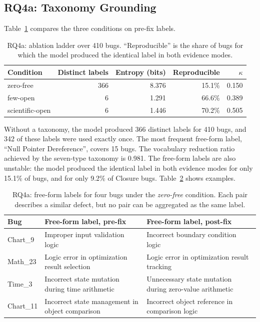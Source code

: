 \documentclass{iutbscthesis}
\begin{document}
\subsection{RQ4a: Taxonomy Grounding}
\label{sec:rq4a}

Table~\ref{tab:rq4a} compares the three conditions on pre-fix labels.

\begin{table}[!htbp]
    \centering
    \begin{tabular}{l r r r r}
        \toprule
        \textbf{Condition} & \textbf{Distinct labels} & \textbf{Entropy (bits)} & \textbf{Reproducible} & $\kappa$ \\
        \midrule
        zero-free       & 366 & 8.376 & 15.1\% & 0.150 \\
        few-open        & 6   & 1.291 & 66.6\% & 0.389 \\
        scientific-open & 6   & 1.446 & 70.2\% & 0.505 \\
        \bottomrule
    \end{tabular}
    \caption{RQ4a: ablation ladder over 410 bugs. ``Reproducible'' is the share of bugs for which the model produced the identical label in both evidence modes.}
    \label{tab:rq4a}
\end{table}

Without a taxonomy, the model produced 366 distinct labels for 410 bugs, and 342 of these labels were used exactly once. The most frequent free-form label, ``Null Pointer Dereference'', covers 15 bugs. The vocabulary reduction ratio achieved by the seven-type taxonomy is 0.981. The free-form labels are also unstable: the model produced the identical label in both evidence modes for only 15.1\% of bugs, and for only 9.2\% of Closure bugs. Table~\ref{tab:rq4a_examples} shows examples.

\begin{table}[!htbp]
    \centering
    \begin{tabular}{l p{5.0cm} p{5.0cm}}
        \toprule
        \textbf{Bug} & \textbf{Free-form label, pre-fix} & \textbf{Free-form label, post-fix} \\
        \midrule
        Chart\_9  & Improper input validation logic & Incorrect boundary condition logic \\
        Math\_23  & Logic error in optimization result selection & Logic error in optimization result tracking \\
        Time\_3   & Incorrect state mutation during time arithmetic & Unnecessary state mutation during zero-value arithmetic \\
        Chart\_11 & Incorrect state management in object comparison & Incorrect object reference in comparison logic \\
        \bottomrule
    \end{tabular}
    \caption{RQ4a: free-form labels for four bugs under the \textit{zero-free} condition. Each pair describes a similar defect, but no pair can be aggregated as the same label.}
    \label{tab:rq4a_examples}
\end{table}
\end{document}
